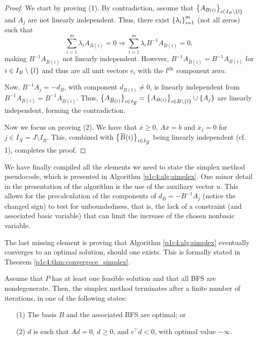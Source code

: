 \begin{proof}
	 We start by proving (1). By contradiction, assume that $\left\{ A_{B(i)} \right \}_{i \in I_B \setminus \left\{ l \right \}}$ and $A_j$ are not linearly independent. Thus, there exist $\left\{ \lambda_i \right \}_{i=1}^m$ (not all zeros) such that
	\begin{equation*}
			\sum_{i=1}^m \lambda_i A_{\overline{B}(i)} = 0 \Rightarrow \sum_{i=1}^m \lambda_i B^{-1}A_{\overline{B}(i)} = 0,
	\end{equation*}
	making $B^{-1}A_{\overline{B}(i)}$ not linearly independent. However, $B^{-1}A_{\overline{B}(i)} = B^{-1}A_{B(i)}$ for $i \in I_B \setminus \left\{ l \right \}$ and thus are all unit vectors $e_i$ with the $l^\text{th}$ component zero. 

	Now, $B^{-1}A_j = -d_B$, with component $d_{B(l)} \neq 0$, is linearly independent from $B^{-1}A_{B(i)} = B^{-1}A_{\overline{B}(i)}$. Thus, $\big\{A_{\overline{B}(i)}\big\}_{i \in I_{\overline{B}}} = \left\{ A_{B(i)} \right \}_{i \in B \setminus \left\{ l \right \}} \cup \left\{ A_j \right \}$ are linearly independent, forming the contradiction.
	
	Now we focus on proving (2). We have that $\overline{x} \geq 0$, $A\overline{x} = b$ and $\overline{x}_j = 0$ for $j \in I_{\overline{N}} = J \setminus I_{\overline{B}}$. This, combined with $\left\{ \overline{B}(i) \right \}_{i \in I_{\overline{B}}}$ being linearly independent (cf. 1), completes the proof.	
\end{proof}

We have finally compiled all the elements we need to state the simplex method pseudocode, which is presented in Algorithm \ref{p1c4:alg:simplex}. One minor detail in the presentation of the algorithm is the use of the auxiliary vector $u$. This allows for the precalculation of the components of $d_B = -B^{-1}A_j$ (notice the changed sign) to test for unboundedness, that is, the lack of a constraint (and associated basic variable) that can limit the increase of the chosen nonbasic variable. 

The last missing element is proving that Algorithm \ref{p1c4:alg:simplex} eventually converges to an optimal solution, should one exists. This is formally stated in Theorem \ref{p1c4:thm:convergece_simplex}.

\begin{theorem}\label{p1c4:thm:convergece_simplex}
	Assume that $P$ has at least one feasible solution and that all BFS are nondegenerate. Then, the simplex method terminates after a finite number of iterations, in one of the following states:
	\begin{enumerate}
		\item[(1)] The basis $B$ and the associated BFS are optimal; or
		\item[(2)] $d$ is such that $Ad = 0$, $d \geq 0$, and $c^\top d < 0$, with optimal value $-\infty$.	
	\end{enumerate}
\end{theorem}

